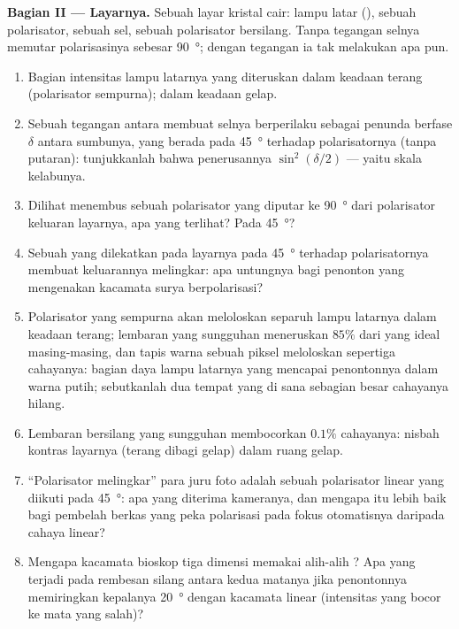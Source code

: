 \begin{problem}
\medskip
\noindent\textbf{Bagian II --- Layarnya.}
Sebuah layar kristal cair: lampu latar (), sebuah polarisator, sebuah
sel, sebuah polarisator bersilang. Tanpa tegangan selnya memutar
polarisasinya sebesar \qty{90}{\degree}; dengan tegangan ia tak melakukan apa pun.
\begin{enumerate}[resume]
  \item Bagian intensitas lampu latarnya yang diteruskan dalam
        keadaan terang (polarisator sempurna); dalam keadaan gelap.
  \item Sebuah tegangan antara membuat selnya berperilaku sebagai penunda
        berfase $\delta$ antara sumbunya, yang berada pada \qty{45}{\degree} terhadap
        polarisatornya (tanpa putaran): tunjukkanlah bahwa penerusannya
        $\sin^2(\delta/2)$ --- yaitu skala kelabunya.
  \item Dilihat menembus sebuah polarisator yang diputar ke \qty{90}{\degree} dari
        polarisator keluaran layarnya, apa yang terlihat? Pada \qty{45}{\degree}?
  \item Sebuah  yang dilekatkan pada layarnya pada \qty{45}{\degree} terhadap
        polarisatornya membuat keluarannya melingkar: apa untungnya bagi penonton
        yang mengenakan kacamata surya berpolarisasi?
  \item Polarisator yang sempurna akan meloloskan separuh lampu latarnya dalam
        keadaan terang; lembaran yang sungguhan meneruskan $85\%$ dari yang ideal masing-masing, dan
        tapis warna sebuah piksel meloloskan sepertiga cahayanya:
        bagian daya lampu latarnya yang mencapai penontonnya dalam warna putih;
        sebutkanlah dua tempat yang di sana sebagian besar cahayanya hilang.
  \item Lembaran bersilang yang sungguhan membocorkan $0.1\%$ cahayanya: nisbah kontras
        layarnya (terang dibagi gelap) dalam ruang gelap.
  \item ``Polarisator melingkar'' para juru foto adalah sebuah polarisator linear
        yang diikuti  pada \qty{45}{\degree}: apa yang
        diterima kameranya, dan mengapa itu lebih baik bagi pembelah berkas
        yang peka polarisasi pada fokus otomatisnya daripada cahaya
        linear?
  \item Mengapa kacamata bioskop tiga dimensi memakai  alih-alih
        ? Apa yang terjadi pada rembesan silang antara kedua matanya
        jika penontonnya memiringkan kepalanya \qty{20}{\degree} dengan kacamata
        linear (intensitas yang bocor ke mata yang salah)?
\end{enumerate}


\end{problem}
